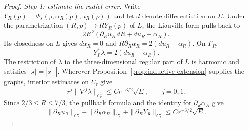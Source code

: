 \documentclass[11pt,a4paper]{article}
\numberwithin{equation}{section}
\theoremstyle{definition}
\theoremstyle{remark}
\begin{document}
	\begin{proof}
		\emph{Step 1: estimate the radial error.}
		Write $Y_R(p)=\Psi_s(p,\alpha_R(p),u_R(p))$ and let $d$ denote
		differentiation on $\Sigma$.
		Under the parametrization $(R,p)\mapsto RY_R(p)$ of $L$, the
		Liouville form pulls back to
		\[
		2R^2(\partial_Ru_R\,dR+du_R-\alpha_R).
		\]
		Its closedness on $L$ gives $d\alpha_R=0$ and
		$R\partial_R\alpha_R=2(du_R-\alpha_R)$.
		On $\Gamma_R$,
		\begin{equation}\label{eqn:contact-equation}
			Y_R^*\lambda=2(du_R-\alpha_R).
		\end{equation}
		The restriction of $\lambda$ to the three-dimensional regular part
		of $L$ is harmonic and satisfies $|\lambda|=|x^\perp|$.
		Wherever Proposition~\ref{prop:inductive-extension} supplies the graphs,
		interior estimates on $U_r$ give
		\begin{equation}\label{eqn:liouville-interior}
			r^j\|\nabla^j\lambda\|_{C^1_r}
			\le C r^{-3/2}\sqrt E,\qquad j=0,1.
		\end{equation}
		Since $2/3\le R\le7/3$, the pullback formula and the identity
		for $\partial_R\alpha_R$ give
		\[
		\|\partial_Ru_R\|_{C^2_r}
		+\|\partial_R\alpha_R\|_{C^2_r}
		+\|\partial_RY_R\|_{C^2_r}
		\le Cr^{-3/2}\sqrt E.
		\]
		

\end{proof}
\end{document}
